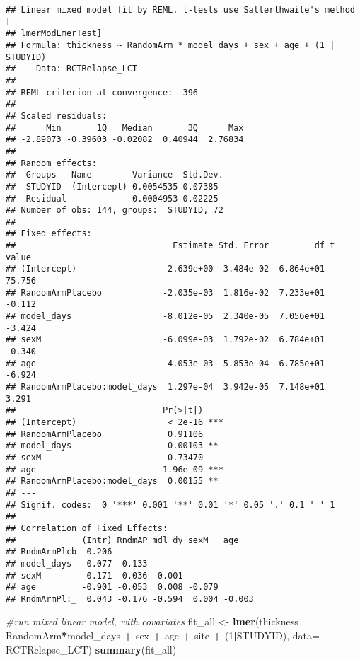 \documentclass[]{article}
\newenvironment{Shaded}{\begin{snugshade}}{\end{snugshade}}
\newcommand{\KeywordTok}[1]{\textcolor[rgb]{0.13,0.29,0.53}{\textbf{#1}}}
\newcommand{\DataTypeTok}[1]{\textcolor[rgb]{0.13,0.29,0.53}{#1}}
\newcommand{\DecValTok}[1]{\textcolor[rgb]{0.00,0.00,0.81}{#1}}
\newcommand{\StringTok}[1]{\textcolor[rgb]{0.31,0.60,0.02}{#1}}
\newcommand{\CommentTok}[1]{\textcolor[rgb]{0.56,0.35,0.01}{\textit{#1}}}
\newcommand{\OperatorTok}[1]{\textcolor[rgb]{0.81,0.36,0.00}{\textbf{#1}}}
\newcommand{\NormalTok}[1]{#1}
\theoremstyle{definition}
\theoremstyle{definition}
\theoremstyle{definition}
\theoremstyle{remark}
\begin{document}
\begin{verbatim}
## Linear mixed model fit by REML. t-tests use Satterthwaite's method [
## lmerModLmerTest]
## Formula: thickness ~ RandomArm * model_days + sex + age + (1 | STUDYID)
##    Data: RCTRelapse_LCT
## 
## REML criterion at convergence: -396
## 
## Scaled residuals: 
##      Min       1Q   Median       3Q      Max 
## -2.89073 -0.39603 -0.02082  0.40944  2.76834 
## 
## Random effects:
##  Groups   Name        Variance  Std.Dev.
##  STUDYID  (Intercept) 0.0054535 0.07385 
##  Residual             0.0004953 0.02225 
## Number of obs: 144, groups:  STUDYID, 72
## 
## Fixed effects:
##                               Estimate Std. Error         df t value
## (Intercept)                  2.639e+00  3.484e-02  6.864e+01  75.756
## RandomArmPlacebo            -2.035e-03  1.816e-02  7.233e+01  -0.112
## model_days                  -8.012e-05  2.340e-05  7.056e+01  -3.424
## sexM                        -6.099e-03  1.792e-02  6.784e+01  -0.340
## age                         -4.053e-03  5.853e-04  6.785e+01  -6.924
## RandomArmPlacebo:model_days  1.297e-04  3.942e-05  7.148e+01   3.291
##                             Pr(>|t|)    
## (Intercept)                  < 2e-16 ***
## RandomArmPlacebo             0.91106    
## model_days                   0.00103 ** 
## sexM                         0.73470    
## age                         1.96e-09 ***
## RandomArmPlacebo:model_days  0.00155 ** 
## ---
## Signif. codes:  0 '***' 0.001 '**' 0.01 '*' 0.05 '.' 0.1 ' ' 1
## 
## Correlation of Fixed Effects:
##             (Intr) RndmAP mdl_dy sexM   age   
## RndmArmPlcb -0.206                            
## model_days  -0.077  0.133                     
## sexM        -0.171  0.036  0.001              
## age         -0.901 -0.053  0.008 -0.079       
## RndmArmPl:_  0.043 -0.176 -0.594  0.004 -0.003
\end{verbatim}

\begin{Shaded}
\begin{Highlighting}[]
\CommentTok{#run mixed linear model, with covariates}
\NormalTok{  fit_all <-}\StringTok{ }\KeywordTok{lmer}\NormalTok{(thickness }\OperatorTok{~}\StringTok{ }\NormalTok{RandomArm}\OperatorTok{*}\NormalTok{model_days }\OperatorTok{+}\StringTok{ }\NormalTok{sex }\OperatorTok{+}\StringTok{ }\NormalTok{age }\OperatorTok{+}\StringTok{ }\NormalTok{site }\OperatorTok{+}\StringTok{ }\NormalTok{(}\DecValTok{1}\OperatorTok{|}\NormalTok{STUDYID), }\DataTypeTok{data=}\NormalTok{ RCTRelapse_LCT)}
  \KeywordTok{summary}\NormalTok{(fit_all)}
\end{Highlighting}
\end{Shaded}
\end{document}
